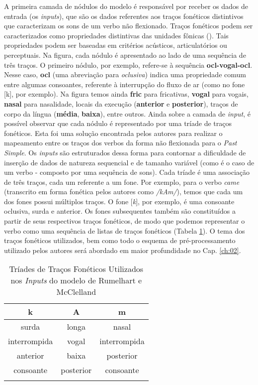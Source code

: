A primeira camada de nódulos do modelo é responsável por receber os dados de entrada (os \textit{inputs}), que são os dados referentes aos traços fonéticos distintivos que caracterizam os sons de um verbo não flexionado. Traços fonéticos podem ser caracterizados como propriedades distintivas das unidades fônicas (\cite{paraconhecer:2015}). Tais propriedades podem ser baseadas em critérios acústicos, articulatórios ou perceptuais. Na figura, cada nódulo é apresentado ao lado de uma sequência de três traços. O primeiro nódulo, por exemplo, refere-se à sequência \textbf{ocl-vogal-ocl}. Nesse caso, \textbf{ocl} (uma abreviação para \textit{oclusiva}) indica uma propriedade comum entre algumas consoantes, referente à interrupção do fluxo de ar (como no fone [k], por exemplo). Na figura temos ainda \textbf{fric} para fricativas, \textbf{vogal} para vogais, \textbf{nasal} para nasalidade, locais da execução (\textbf{anterior} e \textbf{posterior}), traços de corpo da língua (\textbf{média}, \textbf{baixa}), entre outros. Ainda sobre a camada de \textit{input}, é possível observar que cada nódulo é representado por uma tríade de traços fonéticos. Esta foi uma solução encontrada pelos autores para realizar o mapeamento entre os traços dos verbos da forma não flexionada para o \textit{Past Simple}. Os \textit{inputs} são estruturados dessa forma para contornar a dificuldade de inserção de dados de natureza sequencial e de tamanho variável (como é o caso de um verbo - composto por uma sequência de sons). Cada tríade é uma associação de três traços, cada um referente a um fone. Por exemplo, para o verbo \textit{came} (transcrito em forma fonética pelos autores como \textit{/kAm/}), temos que cada um dos fones possui múltiplos traços. O fone [\textit{k}], por exemplo, é uma consoante oclusiva, surda e anterior. Os fones subsequentes também são constituídos a partir de seus respectivos traços fonéticos, de modo que podemos representar o verbo como uma sequência de listas de traços fonéticos (Tabela \ref{tab:trigrams}). O tema dos traços fonéticos utilizados, bem como todo o esquema de pré-processamento utilizado pelos autores \cite{rumelhart:1986} será abordado em maior profundidade no Cap. \ref{ch:02}.

\begin{table}[H]
\begin{center}
\begin{tabular}{ccc}
k                    & A                    & m                    \\ \hline
surda                & longa                & nasal                \\
interrompida         & vogal                & interrompida         \\
anterior             & baixa                & posterior            \\
consoante            & posterior            & consoante            \\
\multicolumn{1}{l}{} & \multicolumn{1}{l}{} & \multicolumn{1}{l}{}
\end{tabular}
\caption{Tríades de Traços Fonéticos Utilizados nos \textit{Inputs} do modelo de Rumelhart e McClelland}
\label{tab:trigrams}
\end{center}
\end{table}

